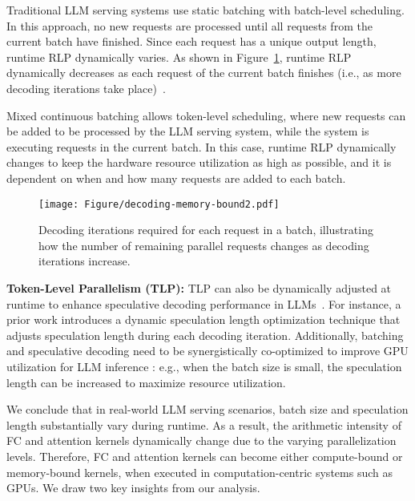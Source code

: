 Traditional LLM serving systems \cite{Tensorflow, Triton} use static batching with batch-level scheduling. In this approach, no new requests are processed until all requests from the current batch have finished. Since each request has a unique output length, runtime RLP dynamically varies. As shown in Figure~\ref{fig:dy}, runtime RLP dynamically decreases as each request of the current batch finishes (i.e., as more decoding iterations take place)~\cite{oh2024exegpt}. 



Mixed continuous batching \cite{agrawal2023sarathi, patel2024splitwise} allows token-level scheduling, where new requests can be added to be processed by the LLM serving system, while the system is executing requests in the current batch. In this case, runtime RLP dynamically changes to keep the hardware resource utilization as high as possible, and it is dependent on when and how many requests are added to each batch.

\begin{figure}[H]

\centering
\texttt{[image: Figure/decoding-memory-bound2.pdf]}
\caption{Decoding iterations required for each request in a batch, illustrating how the number of remaining parallel requests changes as decoding iterations increase.}
\label{fig:dy}

\end{figure}

\noindent\textbf{Token-Level Parallelism (TLP):}
TLP can also be dynamically adjusted at runtime to enhance speculative decoding performance in LLMs~\cite{mamou2024accelerating, su2023synergy}. For instance, a prior work \cite{mamou2024accelerating} introduces a dynamic speculation length optimization technique that adjusts speculation length during each decoding iteration. Additionally, batching and speculative decoding need to be synergistically co-optimized to improve GPU utilization for LLM inference \cite{su2023synergy}: e.g., when the batch size is small, the speculation length can be increased to maximize resource utilization.

We conclude that in real-world LLM serving scenarios, batch size and speculation length substantially vary during runtime.
As a result, the arithmetic intensity of FC and attention kernels dynamically change due to the varying parallelization levels. Therefore, FC and attention kernels can become either compute-bound or memory-bound kernels, when executed in computation-centric systems such as GPUs. We draw two key insights from our analysis.

